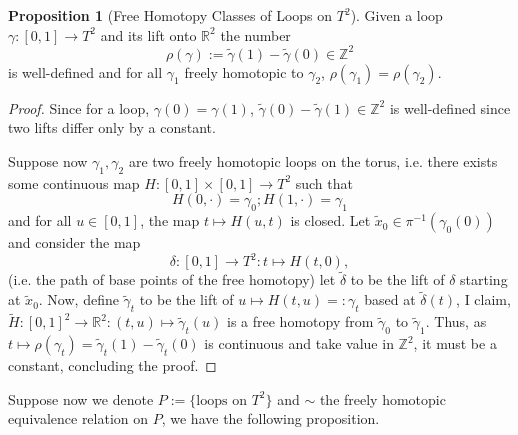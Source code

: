 \documentclass[]{article}
\theoremstyle{definition}
\theoremstyle{definition}
\newtheorem{proposition}{Proposition}[section]
\begin{document}
\begin{proposition}[Free Homotopy Classes of Loops on \(T^2\)]
  Given a loop \(\gamma : [0, 1] \to T^2\) and its lift onto \(\mathbb{R}^2\) 
  the number 
  \[\rho(\gamma) := \tilde \gamma(1) - \tilde \gamma(0) \in \mathbb{Z}^2\]
  is well-defined and for all \(\gamma_1\) freely homotopic to \(\gamma_2\),
  \(\rho(\gamma_1) = \rho(\gamma_2)\).
\end{proposition}
\begin{proof}
  Since for a loop, \(\gamma(0) = \gamma(1)\), 
  \(\tilde \gamma(0) - \tilde \gamma(1) \in \mathbb{Z}^2\) is well-defined 
  since two lifts differ only by a constant.

  Suppose now \(\gamma_1, \gamma_2\) are two freely homotopic loops on the torus, 
  i.e. there exists some continuous map \(H : [0, 1] \times [0, 1] \to T^2\) 
  such that 
  \[H(0, \cdot) = \gamma_0; H(1, \cdot) = \gamma_1\]
  and for all \(u \in [0, 1]\), the map \(t \mapsto H(u, t)\) is closed. Let 
  \(\tilde x_0 \in \pi^{-1}(\gamma_0(0))\) and consider the map 
  \[\delta : [0, 1] \to T^2 : t \mapsto H(t, 0),\]
  (i.e. the path of base points of the free homotopy) let \(\tilde \delta\) to 
  be the lift of \(\delta\) starting at \(\tilde x_0\). Now, define 
  \(\tilde \gamma_t\) to be the lift of \(u \mapsto H(t, u) =: \gamma_t\) based at \(\tilde \delta(t)\), 
  I claim, \(\tilde H : [0, 1]^2 \to \mathbb{R}^2 : (t, u) \mapsto \tilde \gamma_t(u)\) 
  is a free homotopy from \(\tilde \gamma_0\) to \(\tilde \gamma_1\). Thus, 
  as \(t \mapsto \rho(\gamma_t) = \tilde \gamma_t(1) - \tilde \gamma_t(0)\) is continuous 
  and take value in \(\mathbb{Z}^2\), it must be a constant, concluding the proof.
\end{proof}

Suppose now we denote \(P := \{\text{loops on }T^2\}\) and \(\sim\) the freely homotopic 
equivalence relation on \(P\), we have the following proposition.
\end{document}
